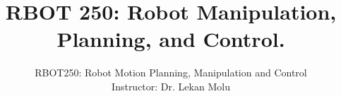 \documentclass[doublespacing]{brandeis}
\author{RBOT250: Robot Motion Planning, Manipulation and Control \\
	Instructor: Dr. Lekan Molu}
\title{RBOT 250: Robot Manipulation, Planning, and Control.
}
\numberwithin{equation}{section}
\theoremstyle{definition}
\begin{document}
	
	\frontmatter
	
	
	\tableofcontents
	\listoffigures %
	\listoftables %
	
	\mainmatter

\newpage




%



%
\providecommand\BIBentryALTinterwordstretchfactor{2.5}

%
\end{document}
